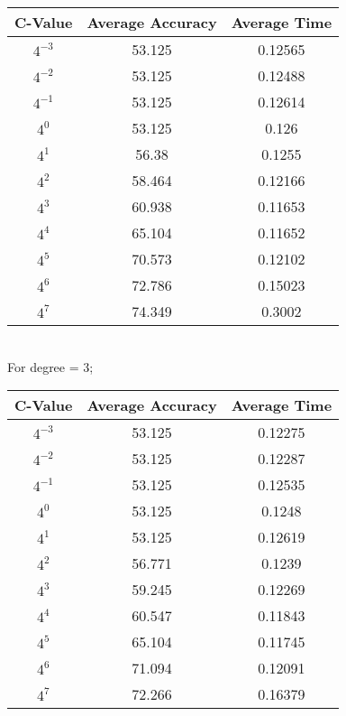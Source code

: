 \documentclass[letter,11pt]{article}
\begin{document}
		\begin{tabular}{|c| c |c |} 
			\hline
			C-Value & Average Accuracy & Average Time \\ [0.5ex] 			
			\hline
			$4^{-3}$ & 53.125  & 0.12565 \\ [0.5ex] 
			\hline
			$4^{-2}$ & 53.125 & 0.12488  \\ 
			\hline
			$4^{-1}$ &  53.125 	  & 0.12614\\
			\hline
			$4^{0}$ &  53.125  & 0.126\\
			\hline
			$4^{1}$ & 56.38  & 0.1255\\
			\hline
			$4^{2}$ &  58.464 & 0.12166\\
			\hline
			$4^{3}$ &   60.938  & 0.11653\\
			\hline
			$4^{4}$ &  65.104  & 0.11652\\
			\hline
			$4^{5}$ &  70.573   & 0.12102\\
			\hline
			$4^{6}$ &  72.786  & 0.15023\\
			\hline
			$4^{7}$ &  74.349 & 0.3002\\
			\hline
			
		\end{tabular}\\

For degree = 3;
		
		\begin{tabular}{|c| c |c |} 
			\hline
			C-Value & Average Accuracy & Average Time \\ [0.5ex] 			
			\hline
			$4^{-3}$ & 53.125  & 0.12275 \\ [0.5ex] 
			\hline
			$4^{-2}$ & 53.125 & 0.12287  \\ 
			\hline
			$4^{-1}$ &  53.125 	  & 0.12535\\
			\hline
			$4^{0}$ &  53.125  & 0.1248\\
			\hline
			$4^{1}$ & 53.125  & 0.12619\\
			\hline
			$4^{2}$ &  56.771 & 0.1239\\
			\hline
			$4^{3}$ &   59.245  & 0.12269\\
			\hline
			$4^{4}$ &  60.547  & 0.11843\\
			\hline
			$4^{5}$ &  65.104   & 0.11745\\
			\hline
			$4^{6}$ &  71.094  & 0.12091\\
			\hline
			$4^{7}$ &  72.266 & 0.16379\\
			\hline
			
		\end{tabular}\\
		
\end{document}
